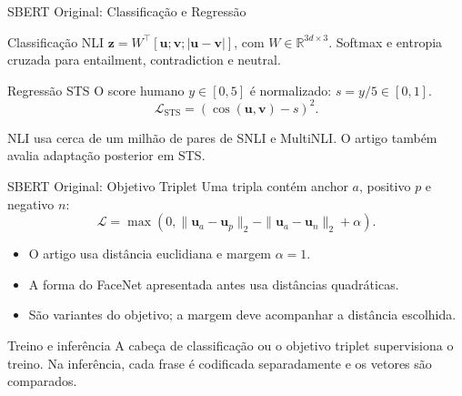 \documentclass[aspectratio=169, xcolor=dvipsnames]{beamer}
\begin{document}
  \begin{frame}{SBERT Original: Classificação e Regressão}
    \begin{block}{Classificação NLI}
      $\mathbf z=W^\top[\mathbf u;\mathbf v;|\mathbf u-\mathbf v|]$, com
      $W\in\mathbb R^{3d\times3}$. Softmax e entropia cruzada para
      entailment, contradiction e neutral.
    \end{block}
    \begin{block}{Regressão STS}
      O score humano $y\in[0,5]$ é normalizado: $s=y/5\in[0,1]$.
      \[
        \mathcal L_{\mathrm{STS}}=(\cos(\mathbf u,\mathbf v)-s)^2.
      \]
    \end{block}
    NLI usa cerca de um milhão de pares de SNLI e MultiNLI.
    O artigo também avalia adaptação posterior em STS.
  \end{frame}

  \begin{frame}{SBERT Original: Objetivo Triplet}
    Uma tripla contém anchor $a$, positivo $p$ e negativo $n$:
    \[
      \mathcal L=\max\left(0,
        \|\mathbf u_a-\mathbf u_p\|_2-
        \|\mathbf u_a-\mathbf u_n\|_2+\alpha\right).
    \]
    \begin{itemize}
      \item O artigo usa distância euclidiana e margem $\alpha=1$.
      \item A forma do FaceNet apresentada antes usa distâncias quadráticas.
      \item São variantes do objetivo; a margem deve acompanhar a distância escolhida.
    \end{itemize}
    \begin{block}{Treino e inferência}
      A cabeça de classificação ou o objetivo triplet supervisiona o treino.
      Na inferência, cada frase é codificada separadamente e os vetores são comparados.
    \end{block}
  \end{frame}
\end{document}
